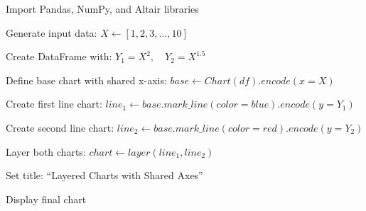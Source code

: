 \begin{algorithm}
\caption{Plot Multiple Layered Charts in Altair with Shared Axes}
\begin{algorithmic}[1]

\STATE Import Pandas, NumPy, and Altair libraries

\STATE Generate input data:
\STATE $X \gets [1,2,3,\dots,10]$

\STATE Create DataFrame with:
\STATE $Y_1 = X^2,\quad Y_2 = X^{1.5}$

\STATE Define base chart with shared x-axis:
\STATE $base \gets Chart(df).encode(x = X)$

\STATE Create first line chart:
\STATE $line_1 \gets base.mark\_line(color = blue).encode(y = Y_1)$

\STATE Create second line chart:
\STATE $line_2 \gets base.mark\_line(color = red).encode(y = Y_2)$

\STATE Layer both charts:
\STATE $chart \gets layer(line_1, line_2)$

\STATE Set title: ``Layered Charts with Shared Axes''

\STATE Display final chart

\end{algorithmic}
\end{algorithm}
